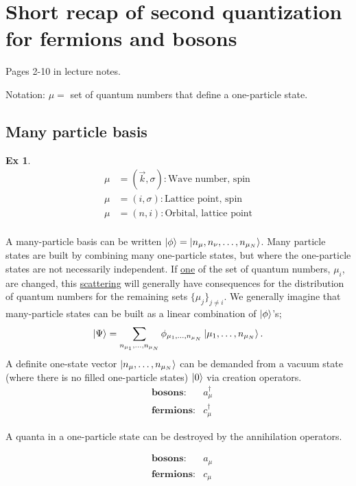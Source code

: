 \section{Short recap of second quantization for fermions and bosons}
Pages 2-10 in lecture notes.

Notation: $ \mu = $ set of quantum numbers that define a one-particle state.


\subsection{Many particle basis}
\newtheorem{theorem}{Ex}
\begin{theorem}


\begin{align*}
\mu &= (\vec{k}, \sigma):\text{Wave number, spin} \\
\mu &= (i, \sigma) : \text{Lattice point, spin} \\
\mu &= (n, i) : \text{Orbital, lattice point} \\
\end{align*}

\end{theorem}

A many-particle basis can be written $\ket{\phi} = \ket{n_{\mu}, n_{\nu}, \dots, n_{\mu_N}}$. Many particle states are built by combining many one-particle states, but where the one-particle states are not necessarily independent. If  \underline{one} of the set of quantum numbers, $\mu_i$, are changed, this \underline{scattering} will generally have consequences for the distribution of quantum numbers for the remaining sets $\{\mu_j\}_{j\ne i}$.
We generally imagine that many-particle states can be built as a linear combination of
$\ket{\phi}$'s;
\begin{equation}
\ket{\Psi} = \sum_{n_{\mu_1},\dots, n_{\mu_N}}\phi_{{\mu_1},\dots, n_{\mu_N}}\ket{{\mu_1},\dots, n_{\mu_N}}.
\end{equation}
A definite one-state vector $\ket{n_{\mu},\dots, n_{\mu_N}}$ can be demanded from a vacuum state (where there is no filled one-particle states) $\ket{0}$ via creation operators.
\begin{align*}
&\textbf{bosons}: &a_\mu^\dagger \\ 
&\textbf{fermions}: &c_\mu^\dagger
\end{align*}


A quanta in a one-particle state can be destroyed by the annihilation operators.

\begin{align*}
&\textbf{bosons}: &a_\mu \\ 
&\textbf{fermions}: &c_\mu
\end{align*}


